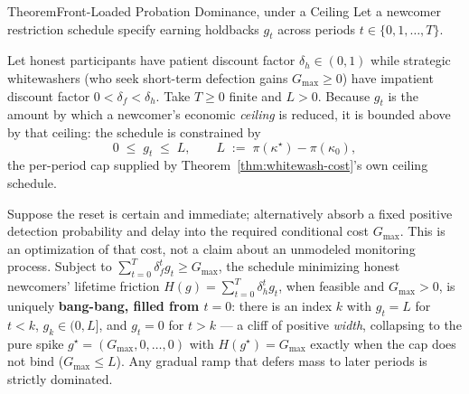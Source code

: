 \documentclass[11pt,a4paper]{article}
\theoremstyle{definition}
\begin{document}

%
\begin{pdclaim}{Theorem}{Front-Loaded Probation Dominance, \mbox{under} a Ceiling}
\setlength{\parskip}{4pt plus 1pt}
\label{thm:probation-dominance}
Let a newcomer restriction schedule specify earning holdbacks $g_t$ across periods
$t\in\{0,1,\dots,T\}$. 

Let honest participants have patient discount factor
$\delta_h\in(0,1)$ while strategic whitewashers (who seek short-term defection gains
$G_{\max}\ge0$) have impatient discount factor $0<\delta_f<\delta_h$. Take
$T\ge0$ finite and $L>0$. Because $g_t$ is the
amount by which a newcomer's economic \emph{ceiling} is reduced, it is bounded above
by that ceiling: the schedule is constrained by
\[
  0 \;\le\; g_t \;\le\; L, \qquad L \;:=\; \pi(\kappa^\star)-\pi(\kappa_0),
\]
the per-period cap supplied by Theorem~\ref{thm:whitewash-cost}'s own ceiling
schedule. 

Suppose the reset is certain and immediate; alternatively absorb a fixed
positive detection probability and delay into the required conditional
cost $G_{\max}$. This is an optimization of that cost, not a claim about an
unmodeled monitoring process. Subject to
$\sum_{t=0}^T \delta_f^t g_t \ge G_{\max}$, the schedule minimizing honest
newcomers' lifetime friction $H(g)=\sum_{t=0}^T \delta_h^t g_t$, when feasible
and $G_{\max}>0$, is uniquely
\textbf{bang-bang, filled from $t=0$}: there is an index $k$ with $g_t=L$ for
$t<k$, $g_k\in(0,L]$, and $g_t=0$ for $t>k$ --- a cliff of positive \emph{width},
collapsing to the pure spike $g^\star=(G_{\max},0,\dots,0)$ with
$H(g^\star)=G_{\max}$ exactly when the cap does not bind ($G_{\max}\le L$). Any
gradual ramp that defers mass to later periods is strictly dominated. 


\end{pdclaim}
\end{document}
